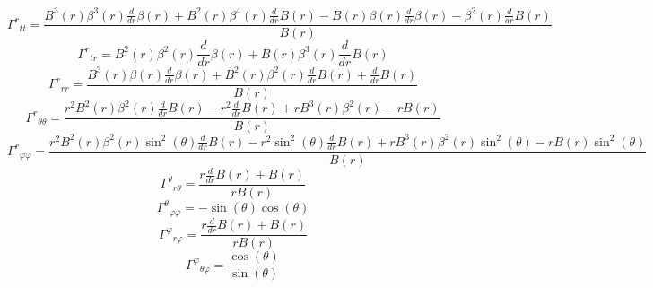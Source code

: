 \documentclass[11pt,a4paper]{article}
\newcommand{\christoffel}[3]{\Gamma^{#1}{}_{#2 #3}}
\begin{document}
\begin{dmath*}
  \christoffel{r}{t}{t} = \frac{B^{3}{\left(r \right)} \beta^{3}{\left(r \right)} \frac{d}{d r} \beta{\left(r \right)} + B^{2}{\left(r \right)} \beta^{4}{\left(r \right)} \frac{d}{d r} B{\left(r \right)} - B{\left(r \right)} \beta{\left(r \right)} \frac{d}{d r} \beta{\left(r \right)} - \beta^{2}{\left(r \right)} \frac{d}{d r} B{\left(r \right)}}{B{\left(r \right)}}
\end{dmath*}
\begin{dmath*}
  \christoffel{r}{t}{r} = B^{2}{\left(r \right)} \beta^{2}{\left(r \right)} \frac{d}{d r} \beta{\left(r \right)} + B{\left(r \right)} \beta^{3}{\left(r \right)} \frac{d}{d r} B{\left(r \right)}
\end{dmath*}
\begin{dmath*}
  \christoffel{r}{r}{r} = \frac{B^{3}{\left(r \right)} \beta{\left(r \right)} \frac{d}{d r} \beta{\left(r \right)} + B^{2}{\left(r \right)} \beta^{2}{\left(r \right)} \frac{d}{d r} B{\left(r \right)} + \frac{d}{d r} B{\left(r \right)}}{B{\left(r \right)}}
\end{dmath*}
\begin{dmath*}
  \christoffel{r}{\theta}{\theta} = \frac{r^{2} B^{2}{\left(r \right)} \beta^{2}{\left(r \right)} \frac{d}{d r} B{\left(r \right)} - r^{2} \frac{d}{d r} B{\left(r \right)} + r B^{3}{\left(r \right)} \beta^{2}{\left(r \right)} - r B{\left(r \right)}}{B{\left(r \right)}}
\end{dmath*}
\begin{dmath*}
  \christoffel{r}{\varphi}{\varphi} = \frac{r^{2} B^{2}{\left(r \right)} \beta^{2}{\left(r \right)} \sin^{2}{\left(\theta \right)} \frac{d}{d r} B{\left(r \right)} - r^{2} \sin^{2}{\left(\theta \right)} \frac{d}{d r} B{\left(r \right)} + r B^{3}{\left(r \right)} \beta^{2}{\left(r \right)} \sin^{2}{\left(\theta \right)} - r B{\left(r \right)} \sin^{2}{\left(\theta \right)}}{B{\left(r \right)}}
\end{dmath*}
\begin{dmath*}
  \christoffel{\theta}{r}{\theta} = \frac{r \frac{d}{d r} B{\left(r \right)} + B{\left(r \right)}}{r B{\left(r \right)}}
\end{dmath*}
\begin{dmath*}
  \christoffel{\theta}{\varphi}{\varphi} = - \sin{\left(\theta \right)} \cos{\left(\theta \right)}
\end{dmath*}
\begin{dmath*}
  \christoffel{\varphi}{r}{\varphi} = \frac{r \frac{d}{d r} B{\left(r \right)} + B{\left(r \right)}}{r B{\left(r \right)}}
\end{dmath*}
\begin{dmath*}
  \christoffel{\varphi}{\theta}{\varphi} = \frac{\cos{\left(\theta \right)}}{\sin{\left(\theta \right)}}
\end{dmath*}
\end{document}
